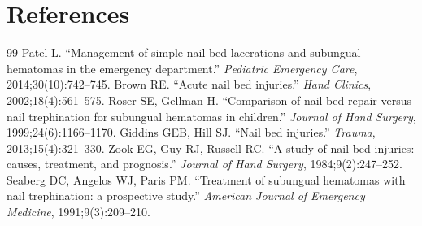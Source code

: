 \section*{References}
\begin{thebibliography}{99}
 Patel L. ``Management of simple nail bed lacerations and subungual hematomas in the emergency department.'' \textit{Pediatric Emergency Care}, 2014;30(10):742--745.
 Brown RE. ``Acute nail bed injuries.'' \textit{Hand Clinics}, 2002;18(4):561--575.
 Roser SE, Gellman H. ``Comparison of nail bed repair versus nail trephination for subungual hematomas in children.'' \textit{Journal of Hand Surgery}, 1999;24(6):1166--1170.
 Giddins GEB, Hill SJ. ``Nail bed injuries.'' \textit{Trauma}, 2013;15(4):321--330.
 Zook EG, Guy RJ, Russell RC. ``A study of nail bed injuries: causes, treatment, and prognosis.'' \textit{Journal of Hand Surgery}, 1984;9(2):247--252.
 Seaberg DC, Angelos WJ, Paris PM. ``Treatment of subungual hematomas with nail trephination: a prospective study.'' \textit{American Journal of Emergency Medicine}, 1991;9(3):209--210.

\end{thebibliography}
